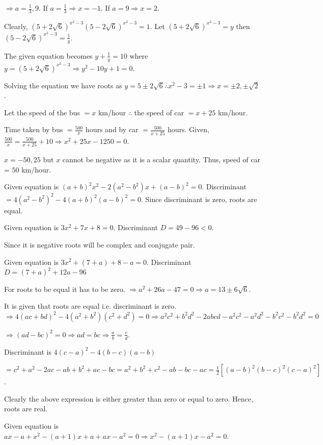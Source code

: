   $\Rightarrow a = \frac{1}{3}, 9$. If $a = \frac{1}{3} \Rightarrow x = -1$. If $a = 9 \Rightarrow x = 2$.
\item Clearly, $(5 + 2\sqrt{6})^{x^2 - 3}(5 - 2\sqrt{6})^{x^2 - 3} = 1$. Let $(5 + 2\sqrt{6})^{x^2 - 3} = y$
  then $(5 - 2\sqrt{6})^{x^2 - 3} = \frac{1}{y}$.

  The given equation becomes $y + \frac{1}{y} = 10$ where $y = (5 + 2\sqrt{6})^{x^2 - 3}\Rightarrow y^2 -10y
  + 1 = 0$.

  Solving the equation we have roots as $y = 5 \pm 2\sqrt{6}\therefore x^2 - 3 = \pm 1\Rightarrow x = \pm2,
  \pm\sqrt{2}$.
\item Let the speed of the bus $= x$ km/hour $\therefore$ the speed of car $= x + 25$ km/hour.

  Time taken by bus $= \frac{500}{x}$ hours and by car $= \frac{500}{x + 25}$ hours. Given, $\frac{500}{x} =
  \frac{500}{x + 25} + 10\Rightarrow x^2 + 25x - 1250 = 0$.

  $x = -50, 25$ but $x$ cannot be negative as it is a scalar quantity. Thus, speed of car = $50$ km/hour.
\item Given equation is $(a + b)^2x^2 - 2(a^2 - b^2)x + (a - b)^2 = 0$. Discriminant $= 4(a^2 - b^2)^2 - 4(a
  + b)^2(a - b)^2 = 0$. Since discriminant is zero, roots are equal.
\item Given equation is $3x^2 + 7x + 8 = 0$. Discriminant $D = 49 - 96 < 0$.

  Since it is negative roots will be complex and conjugate pair.
\item Given equation is $3x^2 + (7 + a) + 8 - a = 0$. Discriminant $D = (7 + a)^2 + 12a -96$

  For roots to be equal it has to be zero. $\Rightarrow a^2 + 26a -47 = 0\Rightarrow a = 13 \pm
  6\sqrt{6}$.
\item It is given that roots are equal i.e. discriminant is zero. $\Rightarrow 4(ac + bd)^2 - 4(a^2 +
  b^2)(c^2 + d^2) = 0\Rightarrow a^2c^2 + b^2d^2 - 2abcd - a^2c^2 - a^2d^2 - b^2c^2 - b^2d^2 = 0$

  $\Rightarrow (ad - bc)^2 = 0\Rightarrow ad = bc \Rightarrow \frac{a}{b} = \frac{c}{d}$.
\item Discriminant is $4(c - a)^2 - 4(b - c)(a - b)$

  $= c^2 + a^2 -2ac - ab + b^2 + ac - bc = a^2 + b^2 + c^2 - ab - bc - ac = \frac{1}{2}[(a - b)^2(b - c)^2(c
  - a)^2]$.

  Clearly the above expression is either greater than zero or equal to zero. Hence, roots are real.
\item Given equation is $ax - a + x^2 - (a + 1)x + a + ax - a^2 = 0\Rightarrow x^2 - (a + 1)x - a^2 = 0$.

